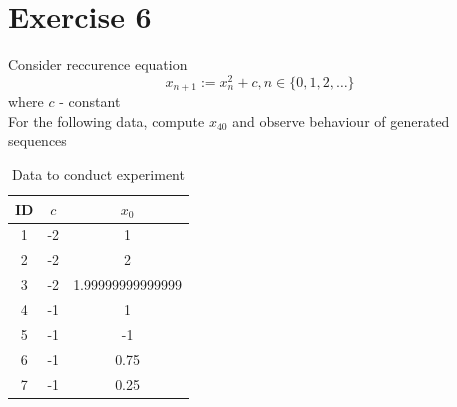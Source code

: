 \documentclass[11pt]{article}
\begin{document}
\section*{Exercise 6}
Consider reccurence equation
\begin{equation*}
    x_{n+1} := x_n^2 + c, n \in \{0, 1, 2, \dots\}
\end{equation*} 
where $c$ - constant\\
For the following data, compute $x_{40}$ and observe behaviour of generated sequences
\begin{table}[!ht]
    \centering
    \begin{tabular}{ccc}
    \hline
        ID & $c$ & $x_0$ \\ \hline
        1 & -2 & 1 \\ 
        2 & -2 & 2 \\ 
        3 & -2 & 1.99999999999999 \\ 
        4 & -1 & 1 \\ 
        5 & -1 & -1 \\ 
        6 & -1 & 0.75 \\ 
        7 & -1 & 0.25 \\ \hline
    \end{tabular}
    \caption{Data to conduct experiment}
\end{table}
\end{document}
